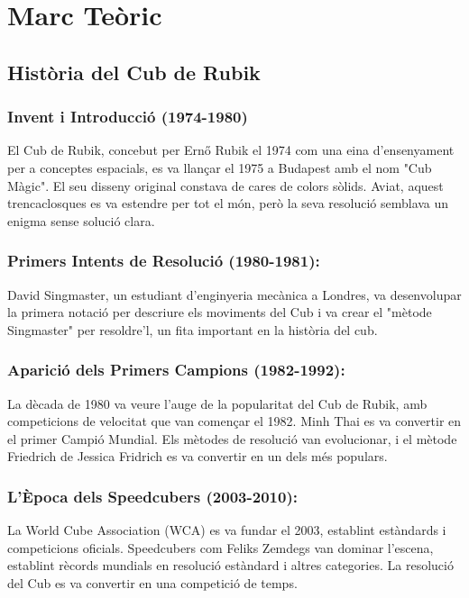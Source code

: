 \section{Marc Teòric}
\subsection{Història del Cub de Rubik}

\subsubsection{Invent i Introducció (1974-1980)}

El Cub de Rubik, concebut per Ernő Rubik el 1974 com una eina d'ensenyament per a conceptes espacials, es va llançar el 1975 a Budapest amb el nom "Cub Màgic". El seu disseny original constava de cares de colors sòlids. Aviat, aquest trencaclosques es va estendre per tot el món, però la seva resolució semblava un enigma sense solució clara.

\subsubsection{Primers Intents de Resolució (1980-1981):}

David Singmaster, un estudiant d'enginyeria mecànica a Londres, va desenvolupar la primera notació per descriure els moviments del Cub i va crear el "mètode Singmaster" per resoldre'l, un fita important en la història del cub.

\subsubsection{Aparició dels Primers Campions (1982-1992):}

La dècada de 1980 va veure l'auge de la popularitat del Cub de Rubik, amb competicions de velocitat que van començar el 1982. Minh Thai es va convertir en el primer Campió Mundial. Els mètodes de resolució van evolucionar, i el mètode Friedrich de Jessica Fridrich es va convertir en un dels més populars.

\subsubsection{L'Època dels Speedcubers (2003-2010):}

La World Cube Association (WCA) es va fundar el 2003, establint estàndards i competicions oficials. Speedcubers com Feliks Zemdegs van dominar l'escena, establint rècords mundials en resolució estàndard i altres categories. La resolució del Cub es va convertir en una competició de temps.

